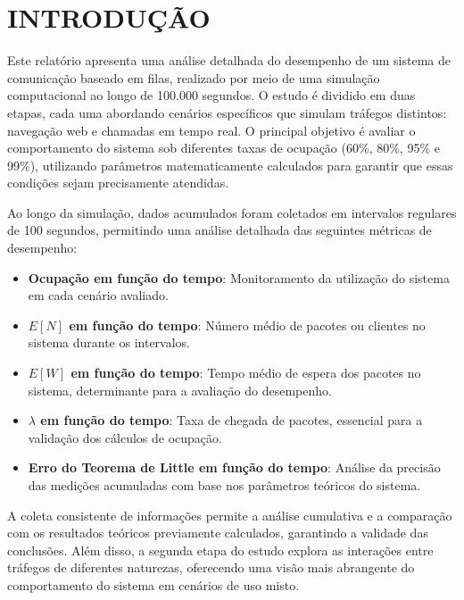 \section{\large INTRODUÇÃO}  

Este relatório apresenta uma análise detalhada do desempenho de um sistema de comunicação baseado em filas, realizado por meio de uma simulação computacional ao longo de 100.000 segundos. O estudo é dividido em duas etapas, cada uma abordando cenários específicos que simulam tráfegos distintos: navegação web e chamadas em tempo real. O principal objetivo é avaliar o comportamento do sistema sob diferentes taxas de ocupação (60\%, 80\%, 95\% e 99\%), utilizando parâmetros matematicamente calculados para garantir que essas condições sejam precisamente atendidas.  

Ao longo da simulação, dados acumulados foram coletados em intervalos regulares de 100 segundos, permitindo uma análise detalhada das seguintes métricas de desempenho:  
\begin{itemize}  
    \item \textbf{Ocupação em função do tempo}: Monitoramento da utilização do sistema em cada cenário avaliado.  
    \item \textbf{$E[N]$ em função do tempo}: Número médio de pacotes ou clientes no sistema durante os intervalos.  
    \item \textbf{$E[W]$ em função do tempo}: Tempo médio de espera dos pacotes no sistema, determinante para a avaliação do desempenho.  
    \item \textbf{$\lambda$ em função do tempo}: Taxa de chegada de pacotes, essencial para a validação dos cálculos de ocupação.  
    \item \textbf{Erro do Teorema de Little em função do tempo}: Análise da precisão das medições acumuladas com base nos parâmetros teóricos do sistema.  
\end{itemize}  

A coleta consistente de informações permite a análise cumulativa e a comparação com os resultados teóricos previamente calculados, garantindo a validade das conclusões. Além disso, a segunda etapa do estudo explora as interações entre tráfegos de diferentes naturezas, oferecendo uma visão mais abrangente do comportamento do sistema em cenários de uso misto.